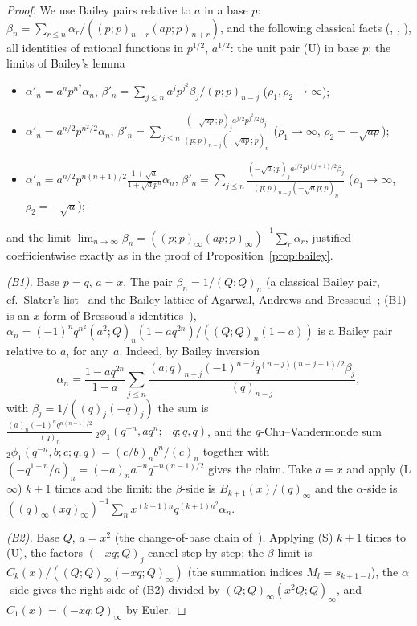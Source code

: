 \documentclass[11pt]{amsart}
\theoremstyle{definition}
\numberwithin{equation}{section}
\begin{document}
\begin{proof}
We use Bailey pairs relative to $a$ in a base $p$: $\beta_n=\sum_{r\le n}\alpha_r/((p;p)_{n-r}(ap;p)_{n+r})$,
and the following classical facts (\cite[§1, §3]{BIS}, \cite{Andrews1984}, \cite{Warnaar50}), all
identities of rational functions in $p^{1/2}$, $a^{1/2}$: the unit pair (U) in base $p$; the limits of
Bailey's lemma
\begin{itemize}[leftmargin=2.2em]
\item[(L$\infty$)] $\alpha'_n=a^np^{n^2}\alpha_n$, $\beta'_n=\sum_{j\le n}a^jp^{j^2}\beta_j/(p;p)_{n-j}$
($\rho_1,\rho_2\to\infty$);
\item[(S)] $\alpha'_n=a^{n/2}p^{n^2/2}\alpha_n$,
$\beta'_n=\sum_{j\le n}\frac{(-\sqrt{ap};p)_ja^{j/2}p^{j^2/2}\beta_j}{(p;p)_{n-j}(-\sqrt{ap};p)_n}$
($\rho_1\to\infty$, $\rho_2=-\sqrt{ap}$);
\item[(S$'$)] $\alpha'_n=a^{n/2}p^{n(n+1)/2}\frac{1+\sqrt a}{1+\sqrt ap^n}\alpha_n$,
$\beta'_n=\sum_{j\le n}\frac{(-\sqrt a;p)_ja^{j/2}p^{j(j+1)/2}\beta_j}{(p;p)_{n-j}(-\sqrt ap;p)_n}$
($\rho_1\to\infty$, $\rho_2=-\sqrt a$);
\end{itemize}
and the limit $\lim_{n\to\infty}\beta_n=((p;p)_\infty(ap;p)_\infty)^{-1}\sum_r\alpha_r$, justified
coefficientwise exactly as in the proof of Proposition~\ref{prop:bailey}.

\emph{(B1).} Base $p=q$, $a=x$. The pair $\beta_n=1/(Q;Q)_n$ (a classical Bailey pair, cf.\ Slater's
list~\cite{Slater} and the Bailey lattice of Agarwal, Andrews and Bressoud~\cite{AAB}; (B1) is an
$x$-form of Bressoud's identities~\cite{Bressoud79,Bressoud80}),
$\alpha_n=(-1)^nq^{n^2}(a^2;Q)_n(1-aq^{2n})/((Q;Q)_n(1-a))$ is a Bailey pair relative to $a$, for any~$a$. Indeed, by Bailey
inversion
\[\alpha_n=\frac{1-aq^{2n}}{1-a}\sum_{j\le n}\frac{(a;q)_{n+j}(-1)^{n-j}q^{(n-j)(n-j-1)/2}\beta_j}{(q)_{n-j}};\]
with $\beta_j=1/((q)_j(-q)_j)$ the sum is
$\frac{(a)_n(-1)^nq^{n(n-1)/2}}{(q)_n}\,{}_2\phi_1(q^{-n},aq^n;-q;q,q)$, and the $q$-Chu--Vandermonde sum
${}_2\phi_1(q^{-n},b;c;q,q)=(c/b)_nb^n/(c)_n$ \cite[(1.5.3)]{GR} together with
$(-q^{1-n}/a)_n=(-a)_na^{-n}q^{-n(n-1)/2}$ gives the claim. Take $a=x$ and apply (L$\infty$) $k+1$ times and the limit:
the $\beta$-side is $B_{k+1}(x)/(q)_\infty$ and the $\alpha$-side is
$((q)_\infty(xq)_\infty)^{-1}\sum_nx^{(k+1)n}q^{(k+1)n^2}\alpha_n$.

\emph{(B2).} Base $Q$, $a=x^2$ (the change-of-base chain of~\cite{BIS}). Applying (S) $k+1$ times to (U), the factors $(-xq;Q)_j$ cancel step by
step; the $\beta$-limit is $C_k(x)/((Q;Q)_\infty(-xq;Q)_\infty)$ (the summation indices
$M_l=s_{k+1-l}$), the $\alpha$-side gives the right side of (B2) divided by $(Q;Q)_\infty(x^2Q;Q)_\infty$,
and $C_1(x)=(-xq;Q)_\infty$ by Euler.


\end{proof}
\end{document}
